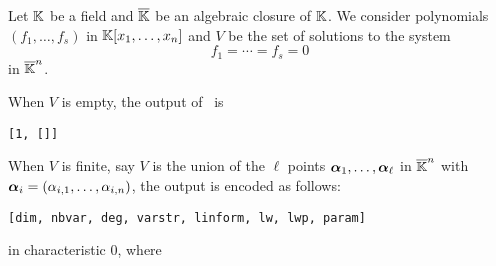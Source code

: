 \documentclass[a4paper,english,11pt]{scrartcl}
\theoremstyle{definition}
\theoremstyle{remark}
\begin{document}
Let $\mathbb{K}$ be a field and $\overline{\mathbb{K}}$ be an algebraic closure of $\mathbb{K}$. We
consider polynomials $(f_1, \ldots, f_s)$  in $\mathbb{K}[x_1, \ldots,
x_n]$ and $V$ be the set of solutions to the system
\[
f_1=\cdots=f_s=0
\]
in $\overline{\mathbb{K}}^n$.

When $V$ is
empty,
the
output of \msolve~is
\begin{verbatim}
[1, []]
\end{verbatim}

When $V$ is finite, say $V$ is the union of the $\ell$ points $\bm{\alpha}_1,
\ldots, \bm{\alpha}_\ell$ in $\overline{\mathbb{K}}^n$ with $\bm{\alpha}_i = (\alpha_{i,1},
\ldots, \alpha_{i,n})$,
the
output is encoded as follows:
\begin{verbatim}
[dim, nbvar, deg, varstr, linform, lw, lwp, param]
\end{verbatim}
in characteristic $0$, where
\end{document}

